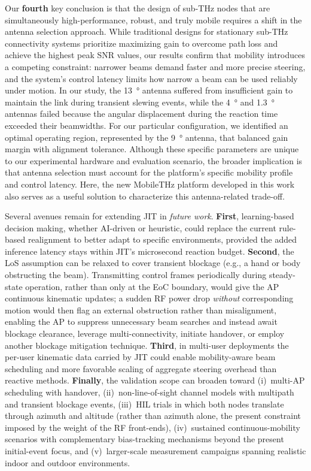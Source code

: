 \documentclass[fleqn,10pt]{wlscirep}
\newcommand{\rev}[1]{{\color{revblue}#1}}
\begin{document}
\rev{Our \textbf{fourth} key conclusion is that the design of sub-THz nodes that are simultaneously high-performance, robust, and truly mobile requires a shift in the antenna selection approach.} While traditional designs for stationary sub-THz connectivity systems prioritize maximizing gain to overcome path loss and achieve the highest peak SNR values, our results confirm that mobility introduces a competing constraint: narrower beams demand faster and more precise steering, and the system's control latency limits how narrow a beam can be used reliably under motion. In our study, the \SI{13}{\degree} antenna suffered from insufficient gain to maintain the link during transient slewing events, while the \SI{4}{\degree} and \SI{1.3}{\degree} antennas failed because the angular displacement during the reaction time exceeded their beamwidths. For our particular configuration, we identified an optimal operating region, represented by the \SI{9}{\degree} antenna, that balanced gain margin with alignment tolerance. Although these specific parameters are unique to our experimental hardware and evaluation scenario, the broader implication is that antenna selection must account for the platform's specific mobility profile and control latency. Here, the new MobileTHz platform developed in this work also serves as a useful solution to characterize this antenna-related trade-off.

\rev{Several avenues remain for extending JIT in \emph{future work}. \textbf{First}, learning-based decision making\cite{10036372}, whether AI-driven or heuristic, could replace the current rule-based realignment to better adapt to specific environments, provided the added inference latency stays within JIT's microsecond reaction budget. \textbf{Second}, the LoS assumption can be relaxed to cover transient blockage (e.g., a hand or body obstructing the beam). Transmitting control frames periodically during steady-state operation, rather than only at the EoC boundary, would give the AP continuous kinematic updates; a sudden RF power drop \emph{without} corresponding motion would then flag an external obstruction rather than misalignment, enabling the AP to suppress unnecessary beam searches and instead await blockage clearance, leverage multi-connectivity, initiate handover, or employ another blockage mitigation technique. \textbf{Third}, in multi-user deployments the per-user kinematic data carried by JIT could enable mobility-aware beam scheduling and more favorable scaling of aggregate steering overhead than reactive methods. \textbf{Finally}, the validation scope can broaden toward (i)~multi-AP scheduling with handover, (ii)~non-line-of-sight channel models with multipath and transient blockage events, (iii)~HIL trials in which both nodes translate through azimuth and altitude (rather than azimuth alone, the present constraint imposed by the weight of the RF front-ends), (iv)~sustained continuous-mobility scenarios with complementary bias-tracking mechanisms beyond the present initial-event focus, and (v)~larger-scale measurement campaigns spanning realistic indoor and outdoor environments.}
\end{document}

